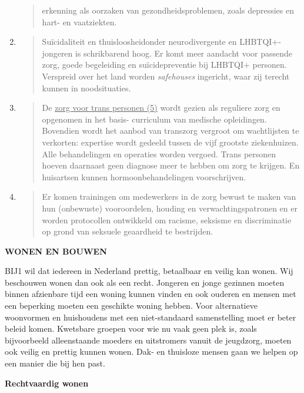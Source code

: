 \begin{enumerate}
\begin{quote}
  erkenning als oorzaken van gezondheidsproblemen, zoals depressies en
  hart- en vaatziekten.~
  \end{quote}
\item
  \begin{quote}
  Suïcidaliteit en thuisloosheidonder neurodivergente en
  LHBTQI+-jongeren is schrikbarend hoog. Er komt meer aandacht voor
  passende zorg, goede begeleiding en suïcidepreventie bij LHBTQI+
  personen. Verspreid over het land worden \emph{safehouses} ingericht,
  waar zij terecht kunnen in noodsituaties.
  \end{quote}
\item
  \begin{quote}
  De \underline{zorg voor trans personen (5)} wordt gezien als reguliere
  zorg en opgenomen in het basis- curriculum van medische opleidingen.
  Bovendien wordt het aanbod van transzorg vergroot om wachtlijsten te
  verkorten: expertise wordt gedeeld tussen de vijf grootste
  ziekenhuizen. Alle behandelingen en operaties worden vergoed. Trans
  personen hoeven daarnaast geen diagnose meer te hebben om zorg te
  krijgen. En huisartsen kunnen hormoonbehandelingen voorschrijven.
  \end{quote}
\item
  \begin{quote}
  Er komen trainingen om medewerkers in de zorg bewust te maken van hun
  (onbewuste) vooroordelen, houding en verwachtingspatronen en er worden
  protocollen ontwikkeld om racisme, seksisme en discriminatie op grond
  van seksuele geaardheid te bestrijden.
  \end{quote}
\end{enumerate}

\textbf{WONEN EN BOUWEN}

BIJ1 wil dat iedereen in Nederland prettig, betaalbaar en veilig kan
wonen. Wij beschouwen wonen dan ook als een recht. Jongeren en jonge
gezinnen moeten binnen afzienbare tijd een woning kunnen vinden en ook
ouderen en mensen met een beperking moeten een geschikte woning hebben.
Voor alternatieve woonvormen en huishoudens met een niet-standaard
samenstelling moet er beter beleid komen. Kwetsbare groepen voor wie nu
vaak geen plek is, zoals bijvoorbeeld alleenstaande moeders en
uitstromers vanuit de jeugdzorg, moeten ook veilig en prettig kunnen
wonen. Dak- en thuisloze mensen gaan we helpen op een manier die bij hen
past.

\textbf{Rechtvaardig wonen}

